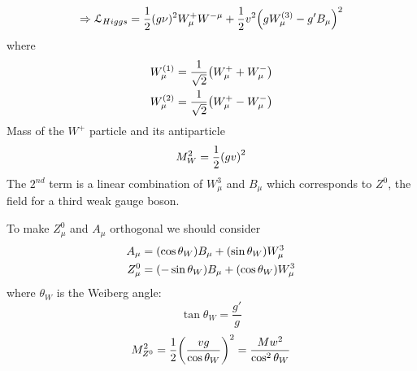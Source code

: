 \documentclass[../main/main.tex]{subfiles}
\begin{document}
\begin{equation}
  \Rightarrow \mathcal{L}_{Higgs} = \frac{1}{2} (g \nu )^2 W_ \mu ^+ W^{- \mu }
  + \frac{1}{2} v^2 \qty(g W _ \mu ^{(3)} - g' B _ \mu )^2
\end{equation}
where
\begin{subequations}
\begin{align}
  W_ \mu ^{(1)} &=  \frac{1}{\sqrt{2} } \qty(W_ \mu ^+ + W _ \mu ^-) \\
  W_ \mu ^{(2)} &=  \frac{1}{\sqrt{2} } \qty(W_ \mu ^+ - W _ \mu ^-)
\end{align}
\end{subequations}
Mass of the \( W^+ \) particle and its antiparticle
\begin{equation}
  M_W^2 = \frac{1}{2} \qty(g v)^2
\end{equation}
The \( 2^{nd} \) term is a linear combination of \( W_ \mu ^3 \) and \( B_ \mu  \) which corresponds to \( Z^0 \), the field for a third weak gauge boson.

To make \( Z_ \mu ^0 \) and \( A _ \mu  \) orthogonal we should consider
\begin{subequations}
\begin{align}
  A_ \mu  &=  \qty(\cos \theta _W) B _ \mu  + \qty(\sin \theta _W ) W_ \mu ^3 \\
  Z_ \mu ^0 & = \qty(- \sin \theta _W ) B _ \mu + \qty(\cos \theta _W ) W_ \mu ^3
\end{align}
\end{subequations}
where \( \theta _W \) is the Weiberg angle:
\begin{equation}
  \tan \theta _W = \frac{g'}{g}
\end{equation}
\begin{equation}
  M_ {Z^0}^2 = \frac{1}{2} \qty(\frac{vg}{\cos \theta _W})^2 = \frac{M w^2}{\cos^2 \theta _W}
\end{equation}
\end{document}
